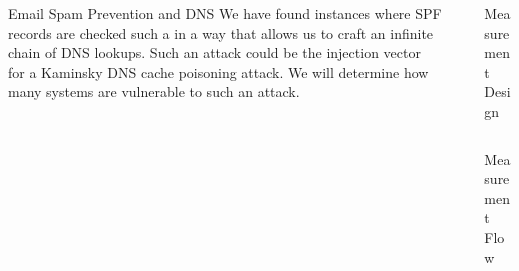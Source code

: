 \documentclass[final]{beamer}
\newlength{\sepwid}
\newlength{\onecolwid}
\newlength{\twocolwid}
\begin{document}
\begin{frame}[t]
\begin{columns}[t]
\begin{column}{\onecolwid}
\begin{block}{Email Spam Prevention and DNS}
We have found instances where SPF records are checked such a in a way that allows us to craft an infinite chain of DNS lookups. Such an attack could be the injection vector for a Kaminsky DNS cache poisoning attack. We will determine how many systems are vulnerable to such an attack.
\end{block}


\end{column} %

\begin{column}{\sepwid}\end{column} %

\begin{column}{\twocolwid} %


\begin{block}{Measurement Design}
\end{block} 

\begin{columns}[t,totalwidth=\twocolwid] %

\begin{column}{\onecolwid}\vspace{-.6in} %


\begin{block}{Measurement Flow}


\end{block}
\end{column}
\end{columns}
\end{column}
\end{columns}
\end{frame}
\end{document}
